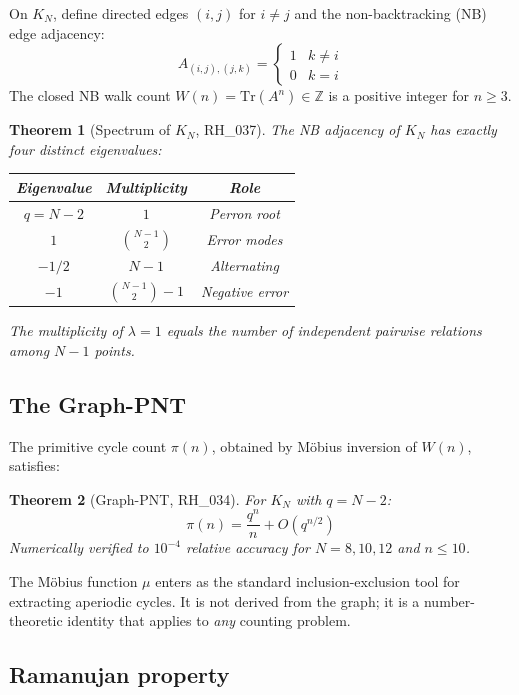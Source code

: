 \documentclass[12pt]{article}
\newtheorem{theorem}{Theorem}[section]
\theoremstyle{definition}
\theoremstyle{remark}
\newcommand{\ZZ}{\mathbb{Z}}
\newcommand{\Tr}{\mathrm{Tr}}
\begin{document}
On $K_N$, define directed edges $(i,j)$ for $i \neq j$ and
the non-backtracking (NB) edge adjacency:
\[
  A_{(i,j),(j,k)} =
  \begin{cases} 1 & k \neq i \\ 0 & k = i \end{cases}
\]
The closed NB walk count $W(n) = \Tr(A^n) \in \ZZ$ is a
positive integer for $n \geq 3$.

\begin{theorem}[Spectrum of $K_N$, RH\_037]\label{thm:spectrum}
The NB adjacency of $K_N$ has exactly four distinct eigenvalues:
\begin{center}
\begin{tabular}{ccc}
\toprule
Eigenvalue & Multiplicity & Role \\
\midrule
$q = N-2$ & $1$ & Perron root \\
$1$ & $\binom{N-1}{2}$ & Error modes \\
$-1/2$ & $N-1$ & Alternating \\
$-1$ & $\binom{N-1}{2} - 1$ & Negative error \\
\bottomrule
\end{tabular}
\end{center}
The multiplicity of $\lambda = 1$ equals the number of
independent pairwise relations among $N-1$ points.
\end{theorem}

\subsection{The Graph-PNT}

The primitive cycle count $\pi(n)$, obtained by M\"obius
inversion of $W(n)$, satisfies:

\begin{theorem}[Graph-PNT, RH\_034]\label{thm:pnt}
For $K_N$ with $q = N-2$:
\[
  \pi(n) = \frac{q^n}{n} + O(q^{n/2})
\]
Numerically verified to $10^{-4}$ relative accuracy for
$N = 8, 10, 12$ and $n \leq 10$.
\end{theorem}

The M\"obius function $\mu$ enters as the standard
inclusion-exclusion tool for extracting aperiodic cycles.
It is not derived from the graph; it is a number-theoretic
identity that applies to \emph{any} counting problem.

\subsection{Ramanujan property}
\end{document}
